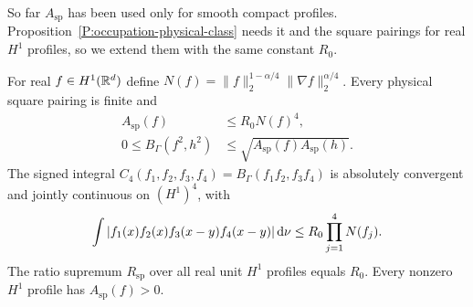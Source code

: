 So far $A_{\mathrm{sp}}$ has been used only for smooth compact profiles.
Proposition~\ref{P:occupation-physical-class} needs it and the square pairings
for real $H^1$ profiles, so we extend them with the same constant $R_0$.

\begin{proposition}
  \label{P:spatial-four-linear}
  For real $f \in H^1(\mathbb{R}^d)$ define $N(f) = \|f\|_2^{1-\alpha/4}\|\nabla
  f\|_2^{\alpha/4}$. Every physical square pairing is finite and
  \begin{align}
    A_{\mathrm{sp}}(f)&\le R_0N(f)^4,\label{E:spatial-homogeneous-bound}\\
    0\le B_\Gamma(f^2,h^2)
    &\le\sqrt{A_{\mathrm{sp}}(f)A_{\mathrm{sp}}(h)}.
    \label{E:spatial-square-CS}
  \end{align}
  The signed integral $C_4(f_1,f_2,f_3,f_4) = B_\Gamma(f_1f_2,f_3f_4)$ is
  absolutely convergent and jointly continuous on $(H^1)^4$, with
  \begin{equation}\label{E:spatial-four-linear}
    \int|f_1(x)f_2(x)f_3(x-y)f_4(x-y)|\,\mathrm{d}\nu
    \le R_0\prod_{j=1}^4N(f_j).
  \end{equation}
  The ratio supremum $R_{\mathrm{sp}}$ over all real unit $H^1$ profiles equals
  $R_0$. Every nonzero $H^1$ profile has $A_{\mathrm{sp}}(f) > 0$.
\end{proposition}

